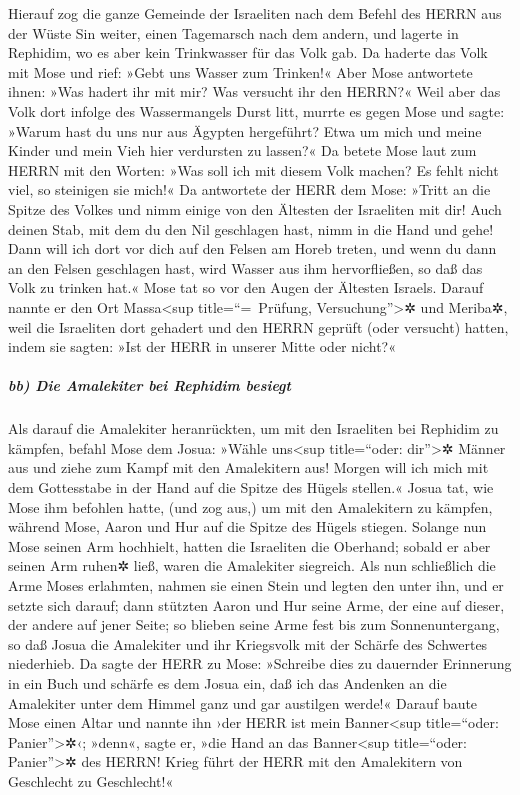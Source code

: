  Hierauf zog die ganze Gemeinde der Israeliten nach dem
Befehl des HERRN aus der Wüste Sin weiter, einen Tagemarsch nach dem
andern, und lagerte in Rephidim, wo es aber kein Trinkwasser für das
Volk gab.  Da haderte das Volk mit Mose und rief: »Gebt
uns Wasser zum Trinken!« Aber Mose antwortete ihnen: »Was hadert ihr mit
mir? Was versucht ihr den HERRN?«  Weil aber das Volk dort
infolge des Wassermangels Durst litt, murrte es gegen Mose und sagte:
»Warum hast du uns nur aus Ägypten hergeführt? Etwa um mich und meine
Kinder und mein Vieh hier verdursten zu lassen?«  Da
betete Mose laut zum HERRN mit den Worten: »Was soll ich mit diesem Volk
machen? Es fehlt nicht viel, so steinigen sie mich!«  Da
antwortete der HERR dem Mose: »Tritt an die Spitze des Volkes und nimm
einige von den Ältesten der Israeliten mit dir! Auch deinen Stab, mit
dem du den Nil geschlagen hast, nimm in die Hand und gehe!
 Dann will ich dort vor dich auf den Felsen am Horeb
treten, und wenn du dann an den Felsen geschlagen hast, wird Wasser aus
ihm hervorfließen, so daß das Volk zu trinken hat.« Mose tat so vor den
Augen der Ältesten Israels.  Darauf nannte er den Ort
Massa\textless sup title=``=~Prüfung, Versuchung''\textgreater✲ und
Meriba✲, weil die Israeliten dort gehadert und den HERRN geprüft (oder
versucht) hatten, indem sie sagten: »Ist der HERR in unserer Mitte oder
nicht?«

\hypertarget{bb-die-amalekiter-bei-rephidim-besiegt}{%
\subparagraph{bb) Die Amalekiter bei Rephidim
besiegt}\label{bb-die-amalekiter-bei-rephidim-besiegt}}

 Als darauf die Amalekiter heranrückten, um mit den
Israeliten bei Rephidim zu kämpfen,  befahl Mose dem
Josua: »Wähle uns\textless sup title=``oder: dir''\textgreater✲ Männer
aus und ziehe zum Kampf mit den Amalekitern aus! Morgen will ich mich
mit dem Gottesstabe in der Hand auf die Spitze des Hügels stellen.«
 Josua tat, wie Mose ihm befohlen hatte, (und zog aus,)
um mit den Amalekitern zu kämpfen, während Mose, Aaron und Hur auf die
Spitze des Hügels stiegen.  Solange nun Mose seinen Arm
hochhielt, hatten die Israeliten die Oberhand; sobald er aber seinen Arm
ruhen✲ ließ, waren die Amalekiter siegreich.  Als nun
schließlich die Arme Moses erlahmten, nahmen sie einen Stein und legten
den unter ihn, und er setzte sich darauf; dann stützten Aaron und Hur
seine Arme, der eine auf dieser, der andere auf jener Seite; so blieben
seine Arme fest bis zum Sonnenuntergang,  so daß Josua
die Amalekiter und ihr Kriegsvolk mit der Schärfe des Schwertes
niederhieb.  Da sagte der HERR zu Mose: »Schreibe dies zu
dauernder Erinnerung in ein Buch und schärfe es dem Josua ein, daß ich
das Andenken an die Amalekiter unter dem Himmel ganz und gar austilgen
werde!«  Darauf baute Mose einen Altar und nannte ihn
›der HERR ist mein Banner\textless sup title=``oder:
Panier''\textgreater✲‹;  »denn«, sagte er, »die Hand an
das Banner\textless sup title=``oder: Panier''\textgreater✲ des HERRN!
Krieg führt der HERR mit den Amalekitern von Geschlecht zu Geschlecht!«


